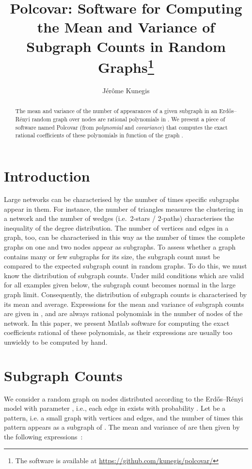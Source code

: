 \documentclass{article}
\title{ 
  Polcovar:  
  Software for Computing the Mean and Variance of Subgraph Counts
  in Random Graphs\footnote{The software is available at \url{https://github.com/kunegis/polcovar/}}
}
\begin{document}
\author{ Jérôme Kunegis }
\maketitle

\begin{abstract}
The mean and variance of the number of appearances of a given subgraph 
in an Erdős--Rényi random graph over  nodes are rational polynomials
in  \cite{gp6}.   
We present a piece of software named Polcovar (from \emph{polynomial}
and \emph{covariance}) that computes the exact rational coefficients of
these polynomials in function of the graph .  
\end{abstract}

\section{Introduction}
Large networks can be characterised by the number of times specific
subgraphs appear in them.  For instance, the number of triangles
measures the clustering in a network and the number of wedges
(i.e.\ 2-stars / 2-paths) characterises the inequality of the degree
distribution.  The number of vertices and edges in a graph, too, can be
characterised in this way as the number of times the complete graphs on
one and two nodes appear as subgraphs.  To assess whether a graph
contains many or few subgraphs for its size, the subgraph count must be
compared to the expected subgraph count in random graphs.  To do this,
we must know the distribution of subgraph counts.  Under mild conditions
which are valid for all examples given below, the subgraph count becomes
normal in the large graph limit.  Consequently, the distribution of
subgraph counts is characterised by its mean and average.  Expressions
for the mean and variance of subgraph counts are given in \cite{gp6},
and are always rational polynomials in the number of nodes  of the network.
In this paper, we present Matlab software for computing the exact
coefficients rational
of these polynomials, as their expressions are usually too unwieldy to
be computed by hand. 

\section{Subgraph Counts}
We consider a random graph  on  nodes distributed according to the
Erdős--Rényi model with parameter , i.e., each edge in  exists with
probability  \cite{b569}. Let  be a pattern, i.e. a small graph with
 vertices and  edges, and  the number of times this pattern
appears as a subgraph of .  
The mean and variance of  are then given by the following
expressions~\cite{gp6}:
\end{document}
